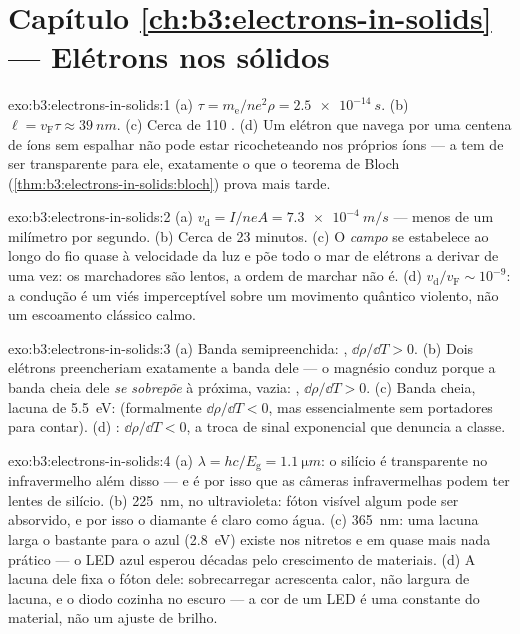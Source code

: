 \section*{Capítulo \ref{ch:b3:electrons-in-solids} --- Elétrons nos sólidos}

\begin{solution}{exo:b3:electrons-in-solids:1}
(a) $\tau = m_{\text{e}}/ne^2\rho = \qty{2.5e-14}{s}$. (b) $\ell =
v_{\text{F}}\tau \approx \qty{39}{nm}$. (c) Cerca de 110 . (d) Um elétron que navega por uma centena de íons sem
espalhar não pode estar ricocheteando nos próprios íons --- a
 tem de ser transparente para ele, exatamente o que o teorema de
Bloch (\cref{thm:b3:electrons-in-solids:bloch}) prova mais tarde.
\end{solution}

\begin{solution}{exo:b3:electrons-in-solids:2}
(a) $v_{\text{d}} = I/neA = \qty{7.3e-4}{m/s}$ --- menos de um
milímetro por segundo. (b) Cerca de 23 minutos. (c) O \emph{campo}
se estabelece ao longo do fio quase à velocidade da luz e põe
todo o mar de elétrons a derivar de uma vez: os marchadores são lentos,
a ordem de marchar não é. (d) $v_{\text{d}}/v_{\text{F}} \sim
10^{-9}$: a condução é um viés imperceptível sobre um movimento
quântico violento, não um escoamento clássico calmo.
\end{solution}

\begin{solution}{exo:b3:electrons-in-solids:3}
(a) Banda semipreenchida: , $\dd\rho/\dd T > 0$. (b) Dois
elétrons preencheriam exatamente a banda dele --- o magnésio conduz
porque a banda cheia dele \emph{se sobrepõe} à próxima, vazia: ,
$\dd\rho/\dd T > 0$. (c) Banda cheia, lacuna de \qty{5.5}{eV}: 
(formalmente $\dd\rho/\dd T < 0$, mas essencialmente sem portadores
para contar). (d) : $\dd\rho/\dd T < 0$, a
troca de sinal exponencial que denuncia a classe.
\end{solution}

\begin{solution}{exo:b3:electrons-in-solids:4}
(a) $\lambda = hc/E_{\text{g}} = \qty{1.1}{\micro m}$: o silício é
transparente no infravermelho além disso --- e é por isso que as câmeras
infravermelhas podem ter lentes de silício. (b) \qty{225}{nm}, no
ultravioleta: fóton visível algum pode ser absorvido, e por isso o
diamante é claro como água. (c) \qty{365}{nm}: uma lacuna larga o
bastante para o azul (\qty{2.8}{eV}) existe nos nitretos e em quase
mais nada prático --- o LED azul esperou décadas pelo crescimento de
materiais. (d) A lacuna dele fixa o fóton dele: sobrecarregar acrescenta
calor, não largura de lacuna, e o diodo cozinha no escuro --- a cor de um
LED é uma constante do material, não um ajuste de brilho.
\end{solution}

